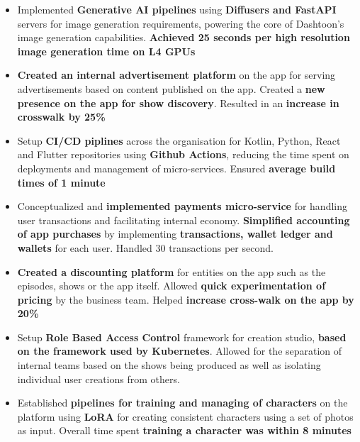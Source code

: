 \documentclass[12pt]{article}
\newcommand{\experienceItem}{\item [-] \small}
\begin{document}
{{{\begin{itemize}[itemsep=0.1ex, leftmargin=6ex, rightmargin=1ex]
{                        \textbf {7 Kubernetes clusters}, giving real time insights on latencies and errors.
                        \textbf {Reduced mean time to resolve issues by 50\%}
                    }
                    \experienceItem
                    {
                        Implemented \textbf {Generative AI pipelines} using \textbf {Diffusers and FastAPI} servers for
                        image \mbox {generation} requirements, powering the core of Dashtoon's image generation capabilities.
                        \textbf {Achieved 25 seconds per high resolution image generation time on L4 GPUs}
                    }
                    \experienceItem
                    {
                        \textbf {Created an internal advertisement platform} on the app for serving advertisements based on
                        content published on the app. Created a \textbf {new presence on the app for show discovery}.
                        Resulted in an \textbf {increase in crosswalk by 25\%}
                    }
                    \experienceItem
                    {
                        Setup \textbf {CI/CD piplines} across the organisation for Kotlin, Python, React and Flutter
                        \mbox {repositories} using \textbf {Github Actions}, reducing the time spent on deployments and
                        management of micro-services. Ensured \textbf {average build times of 1 minute}
                    }
                    \experienceItem
                    {
                        Conceptualized and \textbf {implemented payments micro-service} for handling user transactions and
                        facilitating internal economy. \textbf {Simplified accounting of app purchases} by implementing
                        \textbf {transactions, wallet ledger and wallets} for each user. Handled 30 transactions per second.
                    }
                    \experienceItem
                    {
                        \textbf {Created a discounting platform} for entities on the app such as the episodes, shows
                        or the app itself. Allowed \textbf {quick experimentation of pricing} by the business team.
                        Helped \textbf {increase cross-walk on the app by 20\%}
                    }
                    \experienceItem
                    {
                        Setup \textbf {Role Based Access Control} framework for creation studio, \textbf {based on the
                        framework used by Kubernetes}. Allowed for the separation of internal teams based on the shows
                        being produced as well as isolating individual user creations from others.
                    }
                    \experienceItem
                    {
                        Established \textbf {pipelines for training and managing of characters} on the platform using
                        \textbf {LoRA} for creating consistent characters using a set of photos as input. Overall time
                        spent \textbf {training a character was within 8 minutes}
                    }
                \end{itemize}
            }
        }

}
\end{document}
